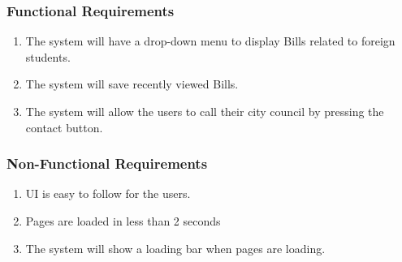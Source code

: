 \documentclass{beamer}
\begin{document}
\begin{frame}
  \frametitle{Functional Requirements}
  \begin{enumerate}
    \item The system will have a drop-down menu to display
      Bills related to foreign students.
    \item The system will save recently viewed Bills.
    \item The system will allow the users to call their city
      council by pressing the contact button.
  \end{enumerate}
\end{frame}

\begin{frame}
  \frametitle{Non-Functional Requirements}
  \begin{enumerate}
    \item UI is easy to follow for the users.
    \item Pages are loaded in less than 2 seconds
    \item The system will show a loading bar when pages are
      loading.
  \end{enumerate}
\end{frame}
\end{document}
